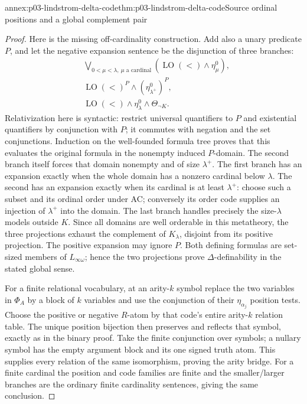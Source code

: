 \begin{annexitem}{annex:p03-lindstrom-delta-code}{thm:p03-lindstrom-delta-code}{Source ordinal positions and a global complement pair}
\begin{proof}
Here is the missing off-cardinality construction. Add also a unary
predicate \(P\), and let the negative expansion sentence be the
disjunction of three branches:
\[
\begin{split}
 &\bigvee_{0<\mu<\lambda,\ \mu\text{ a cardinal}}
                    (\operatorname{LO}(<)\land\eta^0_\mu),\\
 &\operatorname{LO}(<)^P\land(\eta^0_{\lambda^+})^P,\\
 &\operatorname{LO}(<)\land\eta^0_\lambda\land\Theta_{\neg K}.
\end{split}
\]
Relativization here is syntactic: restrict universal quantifiers to \(P\)
and existential quantifiers by conjunction with \(P\); it commutes
with negation and the set conjunctions. Induction on the well-founded
formula tree proves that this evaluates the original formula in the
nonempty induced \(P\)-domain. The second branch itself forces that
domain nonempty and of size \(\lambda^+\). The first branch has an
expansion exactly when the whole domain has a nonzero cardinal below
\(\lambda\). The second has an expansion exactly when its cardinal
is at least \(\lambda^+\): choose such a subset and its ordinal order
under AC; conversely its order code supplies an injection of
\(\lambda^+\) into the domain. The last branch handles precisely
the size-\(\lambda\) models outside \(K\). Since all domains are
well orderable in this metatheory, the three projections exhaust the
complement of \(K_\lambda\), disjoint from its positive projection.
The positive expansion may ignore \(P\). Both defining formulas are
set-sized members of \(L_{\infty\omega}\); hence the two projections
prove \(\Delta\)-definability in the stated global sense.

For a finite relational vocabulary, at an arity-\(k\) symbol replace
the two variables in \(\Phi_A\) by a block of \(k\) variables and
use the conjunction of their \(\eta_{\alpha_j}\) position tests.
Choose the positive or negative \(R\)-atom by that code's entire
arity-\(k\) relation table. The unique position bijection then preserves
and reflects that symbol, exactly as in the binary proof. Take the
finite conjunction over symbols; a nullary symbol has the empty argument
block and its one signed truth atom. This supplies every relation of
the same isomorphism, proving the arity bridge. For a finite cardinal
the position and code families are finite and the smaller/larger branches
are the ordinary finite cardinality sentences, giving the same conclusion.
\end{proof}
\end{annexitem}

